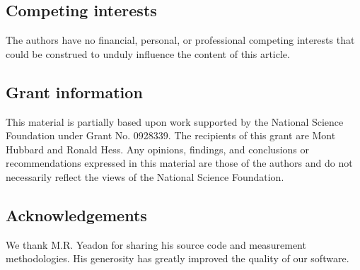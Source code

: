 \documentclass[10pt,a4paper,twocolumn]{article}
\begin{document}
\subsection*{Competing interests}
The authors have no  financial, personal, or professional competing interests
that could be construed to unduly influence the content of this article.

\subsection*{Grant information}
This material is partially based upon work supported by the National Science
Foundation under Grant No. 0928339. The recipients of this grant are Mont
Hubbard and Ronald Hess. Any opinions, findings, and conclusions or
recommendations expressed in this material are those of the authors and do not
necessarily reflect the views of the National Science Foundation.

\subsection*{Acknowledgements}
We thank M.R. Yeadon for sharing his source code and measurement methodologies.
His generosity has greatly improved the quality of our software.

{\small
}



\end{document}
